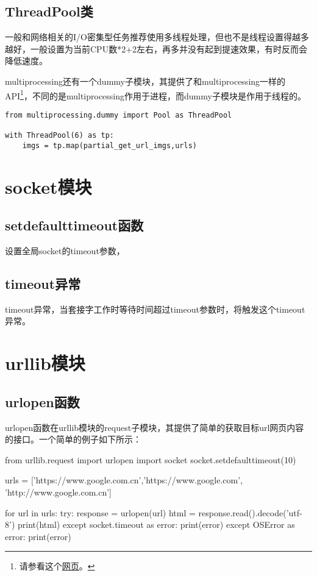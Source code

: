 \documentclass[12pt,oneside]{book}
\begin{document}
\begin{common-format}
\section{ThreadPool类}
一般和网络相关的I/O密集型任务推荐使用多线程处理，但也不是线程设置得越多越好，一般设置为当前CPU数*2+2左右，再多并没有起到提速效果，有时反而会降低速度。

multiprocessing还有一个dummy子模块，其提供了和multiprocessing一样的API\footnote{请参看这个\href{http://segmentfault.com/blog/caspar/1190000000414339b}{网页}。}，不同的是multiprocessing作用于进程，而dummy子模块是作用于线程的。


\begin{Verbatim}
from multiprocessing.dummy import Pool as ThreadPool

with ThreadPool(6) as tp:
    imgs = tp.map(partial_get_url_imgs,urls)
\end{Verbatim}

\chapter{socket模块}
\section{setdefaulttimeout函数}
设置全局socket的timeout参数，

\section{timeout异常}
timeout异常，当套接字工作时等待时间超过timeout参数时，将触发这个timeout异常。

\chapter{urllib模块}
\section{urlopen函数}
urlopen函数在urllib模块的request子模块，其提供了简单的获取目标url网页内容的接口。一个简单的例子如下所示：

\begin{tcbpython}[]
from urllib.request import urlopen
import socket
socket.setdefaulttimeout(10)

urls = ['https://www.google.com.cn','https://www.google.com',
    'http://www.google.com.cn']

for url in urls:
    try:
        response = urlopen(url)
        html = response.read().decode('utf-8')
        print(html)
    except socket.timeout as error:
        print(error)
    except OSError as error:
        print(error)
\end{tcbpython}


\end{common-format}
\end{document}
